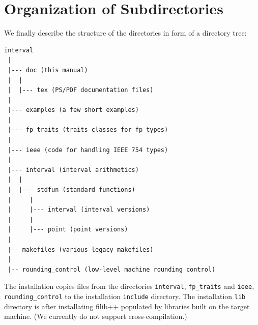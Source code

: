 \documentclass{report}
\begin{document}
\section{Organization of Subdirectories}

We finally describe the structure of the directories in form of a
directory tree:

\newpage

\begin{verbatim}
interval
 |
 |--- doc (this manual)
 |  |
 |  |--- tex (PS/PDF documentation files)
 |
 |--- examples (a few short examples)
 |
 |--- fp_traits (traits classes for fp types)
 |
 |--- ieee (code for handling IEEE 754 types)
 |
 |--- interval (interval arithmetics)
 |  |
 |  |--- stdfun (standard functions)
 |     |
 |     |--- interval (interval versions)
 |     |
 |     |--- point (point versions)
 |
 |-- makefiles (various legacy makefiles)
 |
 |-- rounding_control (low-level machine rounding control)
\end{verbatim}

The installation copies files from the directories
\texttt{interval}, \texttt{fp\_traits} and \texttt{ieee},
\texttt{rounding\_control} to the installation
\texttt{include} directory. The installation \texttt{lib} directory
is after installating filib++ populated by libraries built on the
target machine. (We currently do not support cross-compilation.)
\end{document}

